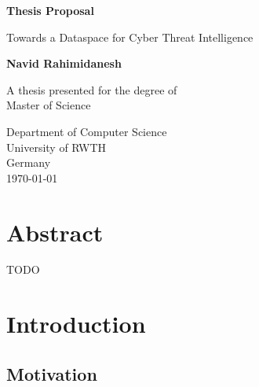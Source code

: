 \documentclass{article}
\author{Navid Rahimidanesh}
\date{March 2023}
\begin{document}

\begin{titlepage}
    \begin{center}
        \vspace*{1cm}
        
        \huge
        \textbf{Thesis Proposal}
        
        \vspace{0.5cm}
        \LARGE
        Towards a Dataspace for Cyber Threat Intelligence
        
        \vspace{1.5cm}
        
        \textbf{Navid Rahimidanesh}
        
        \vfill
        
        A thesis presented for the degree of\\
        Master of Science
        
        \vspace{0.8cm}
        
        
        \Large
        Department of Computer Science\\
        University of RWTH\\
        Germany\\
        \today
        
    \end{center}
\end{titlepage}

\tableofcontents

\newpage

\section{Abstract}

TODO

\section{Introduction} %

\subsection{Motivation}
\end{document}

